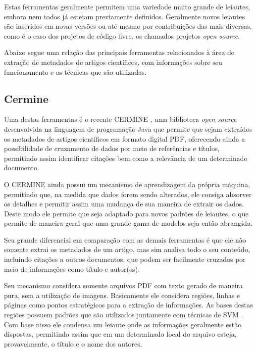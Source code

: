Estas ferramentas geralmente permitem uma variedade muito grande de leiautes, embora nem todos já estejam previamente definidos. Geralmente novos leiautes são inseridos em novas versões ou até mesmo por contribuições das mais diversas, como é o caso dos projetos de código livre, os chamados projetos \textit{open source}.

Abaixo segue uma relação das principais ferramentas relacionados à área de extração de metadados de artigos científicos, com informações sobre seu funcionamento e as técnicas que são utilizadas.

\subsection{Cermine}
\label{ssec:cermine}


Uma destas ferramentas é o recente CERMINE \cite{cermine}, uma biblioteca \textit{open source} desenvolvida na linguagem de programação Java que permite que sejam extraídos os metadados de artigos científicos em formato digital PDF, oferecendo ainda a possibilidade de cruzamento de dados por meio de referências e títulos, permitindo assim identificar citações bem como a relevância de um determinado documento.

O CERMINE ainda possui um mecanismo de aprendizagem da própria máquina, permitindo que, na medida que dados forem sendo alterados, ele consiga absorver os detalhes e permitir assim uma mudança de sua maneira de extrair os dados. Deste modo ele permite que seja adaptado para novos padrões de leiautes, o que permite de maneira geral que uma grande gama de modelos seja então abrangida. 

Seu grande diferencial em comparação com as demais ferramentas é que ele não somente extrai os metadados de um artigo, mas sim analisa todo o seu conteúdo, incluindo citações a outros documentos, que podem ser facilmente cruzados por meio de informações como título e autor(es).

Seu mecanismo considera somente arquivos PDF com texto gerado de maneira pura, sem a utilização de imagens. Basicamente ele considera regiões, linhas e páginas como pontos estratégicos para a extração de informações. As bases destas regiões possuem padrões que são utilizados juntamente com técnicas de SVM \cite{Han-SVM}. Com base nisso ele condensa um leiaute onde as informações geralmente estão dispostas, permitindo assim que em um determinado local do arquivo esteja, provavelmente, o título e o nome dos autores. 

